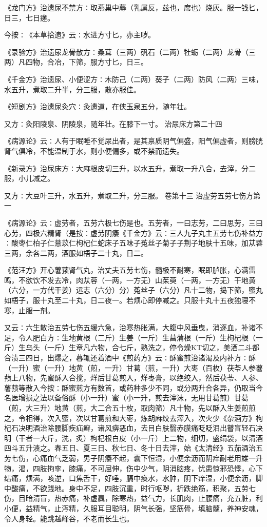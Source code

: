 \documentclass[a4paper,12pt,UTF8,twoside]{ctexbook}
\begin{document}
《龙门方》治遗尿不禁方∶取燕巢中蓐（乳属反，兹也，席也）烧灰。服一钱匕，日三，七日瘥。

今按∶《本草拾遗》云∶水进方寸匕，亦主哕。

《录验方》治遗尿龙骨散方∶桑茸（三两）矾石（二两）牡蛎（二两）龙骨（三两）凡四物，合冶，下筛，服方寸匕，日三。

《千金方》治遗尿、小便涩方∶木防己（二两）葵子（二两）防风（二两）三味，水五升，煮取二升半，分三服，散亦服佳。

《短剧方》治遗尿灸穴∶灸遗道，在侠玉泉五分，随年壮。

又方∶灸阳陵泉、阴陵泉，随年壮。在膝下一寸。
治尿床方第二十四

《病源论》云∶人有于眠睡不觉尿出者，是其禀质阴气偏盛，阳气偏虚者，则膀胱肾气俱冷，不能温制于水，则小便偏多，或不禁而遗失。

《新录方》治尿床方∶大麻根皮切三升，以水五升，煮取一升八合，去滓，分二服，小儿减之。

又方∶大豆叶三升，水五升，煮取二升，分三服。
卷第十三
治虚劳五劳七伤方第一

《病源论》云∶虚劳者，五劳六极七伤是也。五劳者，一曰志劳，二曰思劳，三曰心劳，四极六精肾（是按∶虚劳阴痿《千金方》云∶三人九子丸主五劳七伤补益方∶酸枣仁柏子仁薏苡仁枸杞仁蛇床子五味子菟丝子菊子子荆子地肤十五味，加苁蓉三两，余各二两，酒服如梧子二十丸，日二。

《范汪方》开心薯蓣肾气丸，治丈夫五劳七伤，髓极不耐寒，眠即胪胀，心满雷鸣，不欲饮不发去冷，肉苁蓉（一两，一方无）山茱萸（一两，一方无）干地黄（六分，一方代干姜）远志（六分）分）菟丝子（六分）凡十二物，捣下筛，蜜丸如梧子，服十丸至二十丸，日二夜一。若烦心即停减之。只服十丸十五夜独寝不寒，止服一剂。

又云∶六生散治五劳七伤五缓六急，治寒热胀满，大腹中风垂曳，消逐血，补诸不足，令人肥白方∶生地黄根（二斤）生姜（一斤）生菖蒲根（一斤）生枸杞根（一斤）生乌头（一斤）生章凡六物，合七斤，熟洗之，停令燥KT切之，美酒二斗都合渍三四日，出爆之，暮辄还着酒中《煎药方》云∶酥蜜煎治诸渴及内补方∶酥（一升）蜜（一升）地黄（煎，一升）甘葛（煎，一升）大枣（百枚）茯苓人参薯蓣上八物，先蜜酥入合搅，烊后甘葛煎入，烊枣膏，以绝绞入，然后茯苓、人参、薯蓣等散入今按∶酥蜜煎方有数首，或药种多少不同，或分两升合各异，仍取当今名医增损之法以备俗酥（小一升）蜜（小一升，煎去滓沫，无用甘葛煎）甘葛（煎，大三升）地黄（煎，大二合五十枚，取肉筛）凡十物，先以酥入生姜煎煎之，令相得，次入蜜，次以甘葛煎和大枣，炼胡麻绞去滓入，次火少《杂酒方》枸杞石决明酒治除腰脚疾疝癣，诸风痹恶血，去目白肤翳赤膜痛眨眨泪出瞽盲轻石决明（干者一大斤，洗，炙）枸杞根白皮（小一斤）上二物，细切，盛绢袋，以清酒四斗五升渍之。春五日、夏三日、秋七日、冬十日去滓，始《太清经》五茄酒治五劳七伤，心痛血气乏弱，男子阴痿不起，囊下恒湿，小便余沥而阴痒耐老用雄一升物，渴，四肢拘挛，膝痛，不可屈伸，伤中少气，阴消脑疼，忧患惊邪恐悸，心下结痛，烦满，咳逆，口焦舌干，好唾，膈中痰水，水肿，阴下痒湿，小便余沥，脚中酸痛，不欲践地。身中不足，四肢沉重，时行呕哕，折跌绝筋，积聚，五劳七伤，目暗清盲，热赤痛，补虚羸，除寒热，益气力，长肌肉，止腰痛，充五脏，利小便，益精气，止泻精，久服耳目聪明，阴气长强，坚筋骨，填脑髓，养神安魂，令人身轻。能跳越峰谷，不老而长生也。
\end{document}
